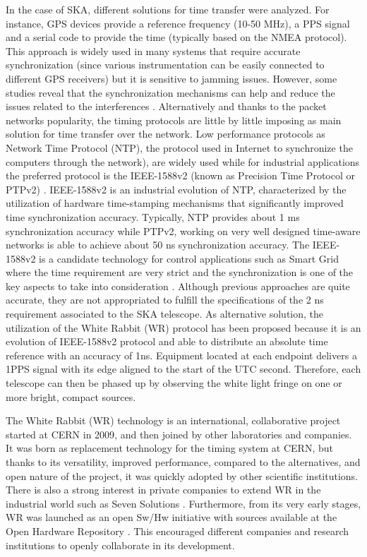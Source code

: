 In the case of SKA, different solutions for time transfer were analyzed. For instance, GPS devices provide a reference frequency (10-50 MHz), a PPS signal and a serial code to provide the time (typically based on the NMEA protocol). This approach is widely used in many systems that require accurate synchronization (since various instrumentation can be easily connected to different GPS receivers) but it is sensitive to jamming issues. However, some studies reveal that the synchronization mechanisms can help and reduce the issues related to the interferences \cite{NOURA2016130}. Alternatively and thanks to the packet networks popularity, the timing protocols are little by little imposing as main solution for time transfer over the network. Low performance protocols as Network Time Protocol (NTP), the protocol used in Internet to synchronize the computers through the network), \cite{ntf:ntp_std} are widely used while for industrial applications the preferred protocol is the IEEE-1588v2 (known as Precision Time Protocol or PTPv2) \cite{ieee:ieee1588_std} \cite{itu:TG8275_1_Y_1369_1}. IEEE-1588v2 is an industrial evolution of NTP, characterized by the utilization of hardware time-stamping mechanisms that significantly improved time synchronization accuracy. Typically, NTP provides about 1 ms synchronization accuracy while PTPv2, working on very well designed time-aware networks is able to achieve about 50 ns synchronization accuracy. The IEEE-1588v2 is a candidate technology for control applications such as Smart Grid \cite{NAFI201623} where the time requirement are very strict and the synchronization is one of the key aspects to take into consideration \cite{COLAK2016396}.
Although previous approaches are quite accurate, they are not appropriated to fulfill the specifications of the 2 ns requirement associated to the SKA telescope. As alternative solution, the utilization of the White Rabbit (WR) protocol has been proposed because it is an evolution of IEEE-1588v2 protocol and able to distribute an absolute time reference with an accuracy of 1ns. Equipment located at each endpoint delivers a 1PPS signal with its edge aligned to the start of the UTC second. Therefore, each telescope can then be phased up by observing the white light fringe on one or more bright, compact sources.

The White Rabbit (WR) technology is an international, collaborative project started at CERN in 2009, and then joined by other laboratories and companies. It was born as replacement technology for the timing system at CERN, but thanks to its versatility, improved performance, compared to the alternatives, and open nature of the project, it was quickly adopted by other scientific institutions. There is also a strong interest in private companies to extend WR in the industrial world such as Seven Solutions \cite{sevensols:wr}. Furthermore, from its very early stages, WR was launched as an open Sw/Hw initiative with sources available at the Open Hardware Repository \cite{ohwr:repo}. This encouraged different companies and research institutions to openly collaborate in its development.


